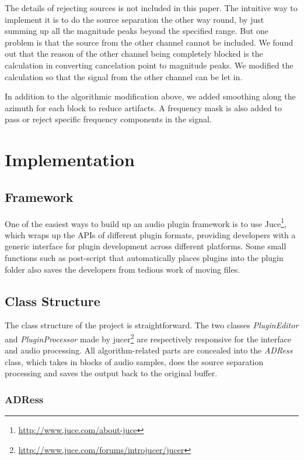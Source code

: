 \documentclass{sig-alternate}
\begin{document}
The details of rejecting sources is not included in this paper. The intuitive way to implement it is to do the source separation the other way round, by just summing up all the magnitude peaks beyond the specified range. But one problem is that the source from the other channel cannot be included. We found out that the reason of the other channel being completely blocked is the calculation in converting cancelation point to magnitude peaks. We modified the calculation so that the signal from the other channel can be let in.

In addition to the algorithmic modification above, we added smoothing along the azimuth for each block to reduce artifacts. A frequency mask is also added to pass or reject specific frequency components in the signal.


\section{Implementation}\label{sec:implementation}

\subsection{Framework}
        
One of the easiest ways to build up an audio plugin framework is to use Juce\footnote{\url{http://www.juce.com/about-juce}}, which wraps up the APIs of different plugin formats, providing developers with a generic interface for plugin development across different platforms. Some small functions such as post-script that automatically places plugins into the plugin folder also saves the developers from tedious work of moving files.

\subsection{Class Structure}

The class structure of the project is straightforward. The two classes \textsl{PluginEditor} and \textsl{PluginProcessor} made by jucer\footnote{\url{http://www.juce.com/forums/introjucer/jucer}} are respectively responsive for the interface and audio processing. All algorithm-related parts are concealed into the \textsl{ADRess} class, which takes in blocks of audio samples, does the source separation processing and saves the output back to the original buffer.

\subsubsection{ADRess}
\end{document}
